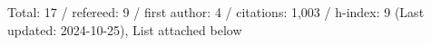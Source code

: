 Total: 17 / refereed: 9 / first author: 4 / citations: 1,003 / h-index: 9 (Last updated: 2024-10-25), List attached below